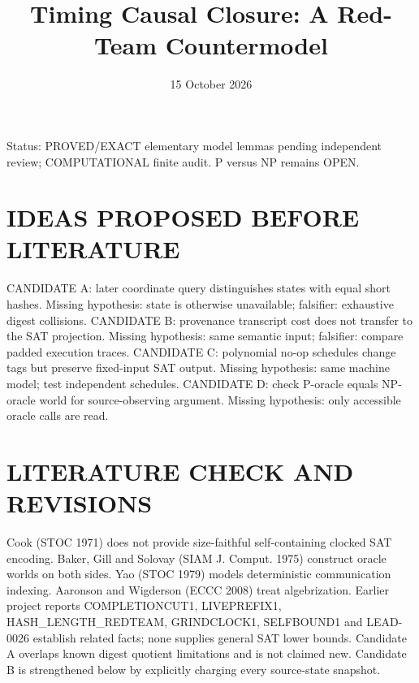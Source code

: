 \documentclass{article}
\title{Timing Causal Closure: A Red-Team Countermodel}
\date{15 October 2026}
\begin{document}
\maketitle
\noindent Status: PROVED/EXACT elementary model lemmas pending independent review; COMPUTATIONAL finite audit. P versus NP remains OPEN.
\section{IDEAS PROPOSED BEFORE LITERATURE}
CANDIDATE A: later coordinate query distinguishes states with equal short hashes. Missing hypothesis: state is otherwise unavailable; falsifier: exhaustive digest collisions. CANDIDATE B: provenance transcript cost does not transfer to the SAT projection. Missing hypothesis: same semantic input; falsifier: compare padded execution traces. CANDIDATE C: polynomial no-op schedules change tags but preserve fixed-input SAT output. Missing hypothesis: same machine model; test independent schedules. CANDIDATE D: check P-oracle equals NP-oracle world for source-observing argument. Missing hypothesis: only accessible oracle calls are read.
\section{LITERATURE CHECK AND REVISIONS}
Cook (STOC 1971) does not provide size-faithful self-containing clocked SAT encoding. Baker, Gill and Solovay (SIAM J. Comput. 1975) construct oracle worlds on both sides. Yao (STOC 1979) models deterministic communication indexing. Aaronson and Wigderson (ECCC 2008) treat algebrization. Earlier project reports COMPLETIONCUT1, LIVEPREFIX1, HASH_LENGTH_REDTEAM, GRINDCLOCK1, SELFBOUND1 and LEAD-0026 establish related facts; none supplies general SAT lower bounds. Candidate A overlaps known digest quotient limitations and is not claimed new. Candidate B is strengthened below by explicitly charging every source-state snapshot.
\end{document}
